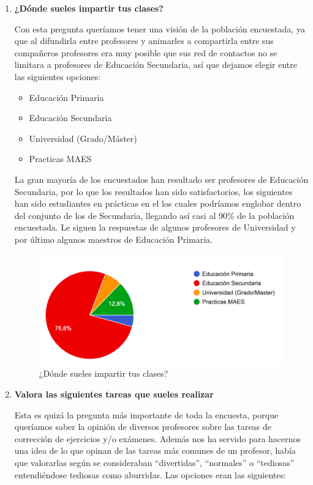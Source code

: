\begin{enumerate}

\item \textbf{¿Dónde sueles impartir tus clases?}

Con esta pregunta queríamos tener una visión de la población encuestada, ya que al difundirla entre profesores y animarles a compartirla entre sus compañeros profesores era muy posible que sus red de contactos no se limitara a profesores de Educación Secundaria, así que dejamos elegir entre las siguientes opciones:

\begin{itemize}
    \item Educación Primaria
    \item Educación Secundaria
    \item Universidad (Grado/Máster)
    \item Practicas MAES
\end{itemize}

\bigskip
La gran mayoría de los encuestados han resultado ser profesores de Educación Secundaria, por lo que los resultados han sido satisfactorios, los siguientes han sido estudiantes en prácticas en el \master los cuales podríamos englobar dentro del conjunto de los de Secundaria, llegando así casi al 90\% de la población encuestada. Le siguen la respuestas de algunos profesores de Universidad y por último algunos maestros de Educación Primaria.

\begin{figure}[H]
\centering
\includegraphics[width=1.0\textwidth]{../images/quiz_1}
\caption{¿Dónde sueles impartir tus clases?}
\label{fig:quiz_1}
\end{figure}


\item \textbf{Valora las siguientes tareas que sueles realizar}

Esta es quizá la pregunta más importante de toda la encuesta, porque queríamos saber la opinión de diversos profesores sobre las tareas de corrección de ejercicios y/o exámenes. Además nos ha servido para hacernos una idea de lo que opinan de las tareas más comunes de un profesor, había que valorarlas según se consideraban ``divertidas'', ``normales'' o ``tediosas'' entendiéndose tediosas como aburridas. Las opciones eran las siguientes:


\end{enumerate}
